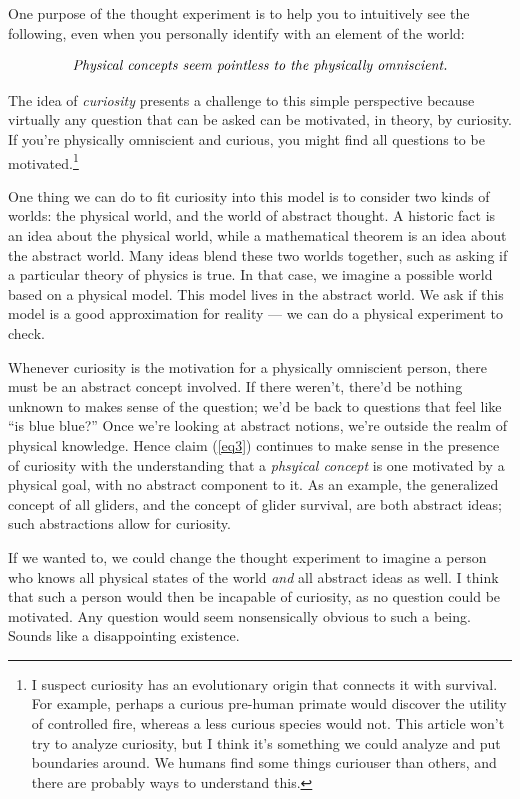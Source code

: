 \documentclass[11pt, oneside]{article}
\theoremstyle{argtstyle}
\begin{document}
One purpose of the thought experiment is to help you to intuitively
see the following, even when you personally identify with an
element of the world:

\begin{equation}\label{eq3}
    \text{\em Physical concepts seem pointless to the physically omniscient.}
\end{equation}

The idea of {\em curiosity} presents a challenge to
this simple perspective because
virtually any question that can be asked can be motivated, in theory, by
curiosity. If you're physically omniscient and curious, you might find all
questions to be motivated.\footnote{I suspect curiosity has an evolutionary
origin that connects it with survival. For example, perhaps a curious pre-human
primate would discover the utility of controlled fire, whereas a less curious
species would not. This article won't try to analyze curiosity, but I think it's
something we could analyze and put boundaries around. We humans find some things
curiouser than others, and there are probably ways to understand this.}

One thing we can do to fit curiosity into this model is to consider two kinds
of worlds: the physical world, and the world of abstract thought.
A historic fact is an idea about the physical world, while a mathematical
theorem is an idea about the abstract world.
Many ideas blend these two worlds together, such as asking if a particular
theory of physics is true. In that case, we imagine a possible world based on a
physical model. This model lives in the abstract world. We ask if this model
is a good approximation for reality ---
we can do a physical experiment to check.

Whenever curiosity is the motivation for a physically omniscient person, there
must be an abstract concept involved. If there weren't, there'd be
nothing unknown to makes sense of the question; we'd be back to questions
that feel like
``is blue blue?''
Once we're looking at abstract
notions, we're outside the realm of physical knowledge.
Hence claim (\ref{eq3}) continues to make sense in
the presence of curiosity with the understanding that a
{\em phsyical concept} is one motivated by a physical goal, with
no abstract component to it.
As an example,
the generalized
concept of all gliders, and the concept of glider survival, are both
abstract ideas; such abstractions allow for curiosity.

If we wanted to, we could change the thought experiment to imagine a person who
knows all physical states of the world {\em and} all abstract ideas as well. I
think that such a person would then be incapable of curiosity, as no question
could be motivated. Any question would seem nonsensically obvious
to such a being. Sounds like a disappointing existence.
\end{document}
